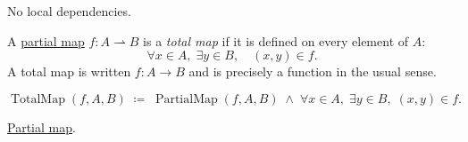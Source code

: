 \begin{remark*}[Dependencies]
No local dependencies.
\end{remark*}


\begin{definition}
\label{def:total-map}
A \hyperref[def:partial-map]{partial map} $f : A \rightharpoonup B$ is a
\emph{total map} if it is defined on every element of $A$:
\[
\forall x \in A,\; \exists y \in B,\quad (x, y) \in f.
\]
A total map is written $f : A \to B$ and is precisely a function in the
usual sense.
\end{definition}

\begin{remark*}
\[
\operatorname{TotalMap}(f, A, B)
\;\coloneqq\;
\operatorname{PartialMap}(f, A, B)
\;\land\;
\forall x \in A,\; \exists y \in B,\; (x, y) \in f.
\]
\end{remark*}

\begin{remark*}[Dependencies]
\hyperref[def:partial-map]{Partial map}.
\end{remark*}
